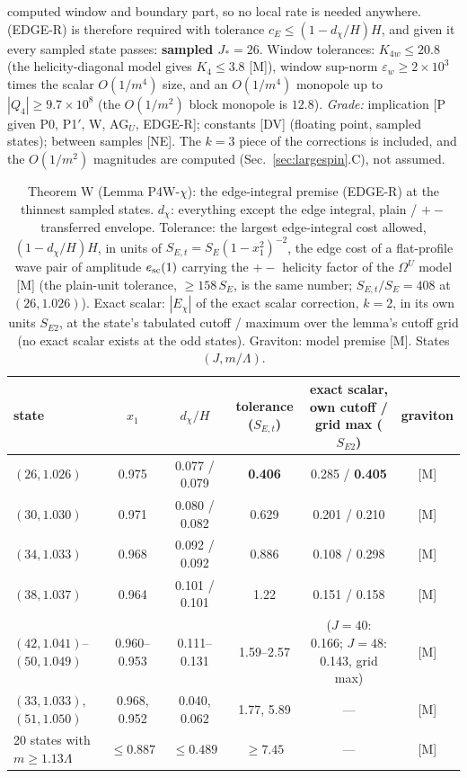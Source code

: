 \documentclass[aps,prl,onecolumn,superscriptaddress,nofootinbib]{revtex4-2}
\begin{document}
computed window and boundary part, so no local rate is needed anywhere. (EDGE-R) is therefore required with tolerance
$c_E\le(1-d_\chi/H)H$, and given it every sampled state passes: \textbf{sampled $J_*=26$}. Window tolerances:
$K_{4w}\le20.8$ (the helicity-diagonal model gives $K_4\le3.8$ [M]), window sup-norm $\varepsilon_w\ge2\times10^3$ times the scalar
$O(1/m^4)$ size, and an $O(1/m^4)$ monopole up to $|Q_4|\ge9.7\times10^8$ (the $O(1/m^2)$ block monopole is $12.8$). \emph{Grade:}
implication [P given P0, P1$'$, W, AG$_U$, EDGE-R]; constants [DV] (floating point, sampled states); between samples [NE]. The $k=3$
piece of the corrections is included, and the $O(1/m^2)$ magnitudes are computed (Sec.~\ref{sec:largespin}.C), not assumed.

\begin{table}[!htbp]
\caption{\label{tab:jstarW}Theorem W (Lemma P4W-$\chi$): the edge-integral premise (EDGE-R) at the thinnest sampled states.
$d_\chi$: everything except the edge integral, plain / $+-$ transferred envelope. Tolerance: the largest edge-integral cost allowed,
$(1-d_\chi/H)H$, in units of $S_{E,t}=S_E(1-x_1^2)^{-2}$, the edge cost of a flat-profile wave pair of amplitude $e_{\rm sc}(1)$ carrying the
$+-$ helicity factor of the $\Omega^U$ model [M] (the plain-unit tolerance, $\ge158\,S_E$, is the same number; $S_{E,t}/S_E=408$ at
$(26,1.026)$). Exact scalar: $|E_\chi|$ of the exact scalar correction, $k=2$, in its own units $S_{E2}$, at the state's tabulated cutoff
/ maximum over the lemma's cutoff grid (no exact scalar exists at the odd states). Graviton: model premise [M]. States
$(J,m/\Lambda)$.}
\footnotesize
\begin{ruledtabular}
\begin{tabular}{lccccc}
state & $x_1$ & $d_\chi/H$ & tolerance ($S_{E,t}$) & exact scalar, own cutoff / grid max ($S_{E2}$) & graviton\\\hline
$(26,1.026)$ & 0.975 & 0.077 / 0.079 & \textbf{0.406} & 0.285 / \textbf{0.405} & [M]\\
$(30,1.030)$ & 0.971 & 0.080 / 0.082 & 0.629 & 0.201 / 0.210 & [M]\\
$(34,1.033)$ & 0.968 & 0.092 / 0.092 & 0.886 & 0.108 / 0.298 & [M]\\
$(38,1.037)$ & 0.964 & 0.101 / 0.101 & 1.22 & 0.151 / 0.158 & [M]\\
$(42,1.041)$--$(50,1.049)$ & 0.960--0.953 & 0.111--0.131 & 1.59--2.57 & ($J=40$: 0.166; $J=48$: 0.143, grid max) & [M]\\
$(33,1.033)$, $(51,1.050)$ & 0.968, 0.952 & 0.040, 0.062 & 1.77, 5.89 & --- & [M]\\
20 states with $m\ge1.13\Lambda$ & $\le0.887$ & $\le0.489$ & $\ge7.45$ & --- & [M]\\
\end{tabular}
\end{ruledtabular}
\end{table}
\end{document}
